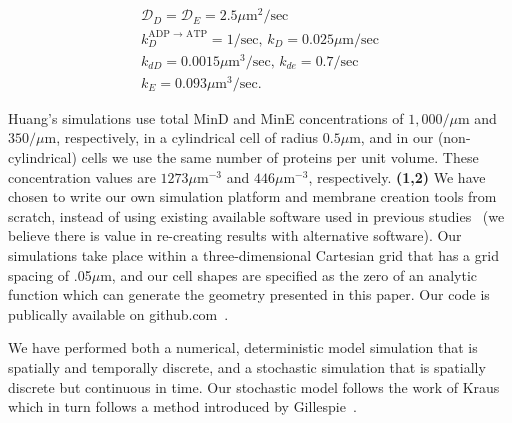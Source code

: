 \documentclass[10pt,letterpaper]{article}
\newcommand\micron{\ensuremath{\mu\text{m}}}
\newcommand{\blue}[1]{{\bf \color{blue} #1}}
\begin{document}
\begin{gather*}
  \mathcal{D}_D = \mathcal{D}_{E} = 2.5\micron^2/\text{sec}\\
  k_D^{\textrm{ADP $\rightarrow$ ATP}} = 1/\textrm{sec,  }
  k_D = 0.025 \micron /\textrm{sec}\\
  k_{dD} = 0.0015 \micron^3/ \textrm{sec,  }
  k_{de} = 0.7/\textrm{sec}\\
  k_E = 0.093 \micron^3 /\textrm{sec}.
\end{gather*}

Huang's simulations use total MinD and MinE concentrations of
$1,000/\micron$ and $350/\micron$, respectively, in a cylindrical cell
of radius $0.5\micron$, and in our (non-cylindrical) cells we use the
same number of proteins per unit volume.  These concentration values
are $1273\micron^{-3}$ and $446\micron^{-3}$,
respectively. \blue{(1,2)} We have chosen to write our own simulation
platform and membrane creation tools from scratch, instead of using
existing available software used in previous
studies~\cite{bonny2013membrane,fange2006noise,halatek2012highly,kerr2006division}
(we believe there is value in re-creating results with alternative
software).  Our simulations take place within a three-dimensional
Cartesian grid that has a grid spacing of .05\micron, and our cell
shapes are specified as the zero of an analytic function which can
generate the geometry presented in this paper.  Our code is publically
available on github.com~\cite{git}.

We have performed both a numerical, deterministic model simulation
that is spatially and temporally discrete, and a stochastic simulation
that is spatially discrete but continuous in time.  Our stochastic
model follows the work of Kraus~\cite{kraus1996crosstalk} which in
turn follows a method introduced by
Gillespie~\cite{gillespie1977exact}.
\end{document}
